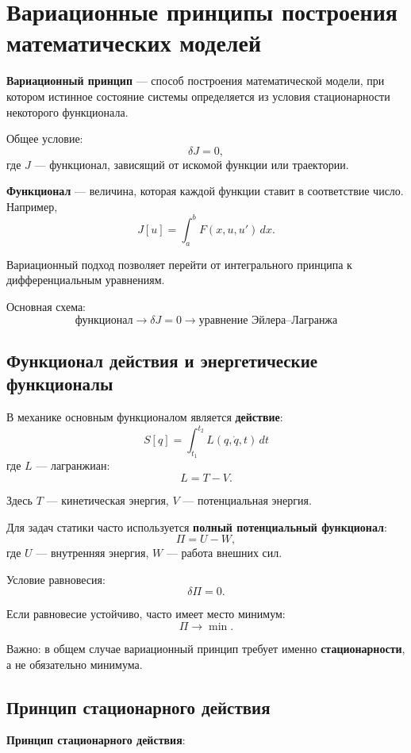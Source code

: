 \section{Вариационные принципы построения математических моделей}
\label{sec:variational-principles-of-modeling}

\textbf{Вариационный принцип} --- способ построения математической модели,
при котором истинное состояние системы определяется из условия
стационарности некоторого функционала.

Общее условие:
\[
\boxed{\delta J=0},
\]
где $J$ --- функционал, зависящий от искомой функции или траектории.

\textbf{Функционал} --- величина, которая каждой функции ставит в
соответствие число. Например,
\[
J[u]=\int_a^b F(x,u,u')\,dx.
\]

Вариационный подход позволяет перейти от интегрального принципа
к дифференциальным уравнениям.

Основная схема:
\[
\boxed{
	\text{функционал}
	\rightarrow
	\delta J=0
	\rightarrow
	\text{уравнение Эйлера--Лагранжа}
}
\]

\subsection{Функционал действия и энергетические функционалы}

В механике основным функционалом является \textbf{действие}:
\[
\boxed{
	S[q]=\int_{t_1}^{t_2}L(q,\dot q,t)\,dt
}
\]
где $L$ --- лагранжиан:
\[
\boxed{L=T-V}.
\]

Здесь $T$ --- кинетическая энергия, $V$ --- потенциальная энергия.

Для задач статики часто используется \textbf{полный потенциальный
	функционал}:
\[
\boxed{\Pi=U-W},
\]
где $U$ --- внутренняя энергия, $W$ --- работа внешних сил.

Условие равновесия:
\[
\boxed{\delta\Pi=0}.
\]

Если равновесие устойчиво, часто имеет место минимум:
\[
\Pi\rightarrow\min.
\]

Важно: в общем случае вариационный принцип требует именно
\textbf{стационарности}, а не обязательно минимума.

\subsection{Принцип стационарного действия}

\textbf{Принцип стационарного действия}:


